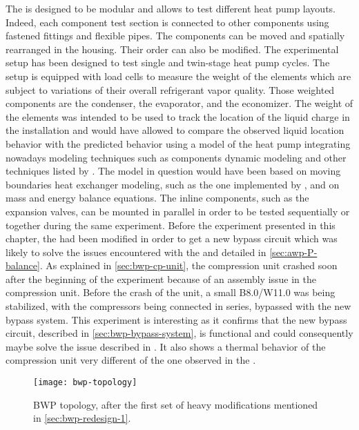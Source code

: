 The \BWP{} is designed to be modular and allows to test different heat
pump layouts. Indeed, each component test section is connected to
other components using fastened fittings and flexible pipes. The
components can be moved and spatially rearranged in the housing. Their
order can also be modified. The experimental setup has been designed to
test single and twin-stage heat pump cycles. The setup is equipped
with load cells to measure the weight of the elements which are
subject to variations of their overall refrigerant vapor
quality. Those weighted components are the condenser, the evaporator,
and the economizer. The weight of the elements was intended to be used
to track the location of the liquid charge in the installation and
would have allowed to compare the observed liquid location behavior
with the predicted behavior using a model of the heat pump integrating
nowadays modeling techniques such as components dynamic modeling and
other techniques listed by \citet{Ding-2007a}. The model in
question would have been based on moving boundaries heat exchanger
modeling, such as the one implemented by \citet{Bell-Lemort-2015a},
and on mass and energy balance equations. The inline components, such
as the expansion valves, can be mounted in parallel in order to be
tested sequentially or together during the same experiment. Before the
experiment presented in this chapter, the \BWP{} had been modified in
order to get a new bypass circuit which was likely to solve the issues
encountered with the \AWP{} and detailed in
\cref{sec:awp-P-balance}. As explained in \cref{sec:bwp-cp-unit}, the
compression unit crashed soon after the beginning of the experiment
because of an assembly issue in the compression unit. Before the crash
of the unit, a small B8.0/W11.0 \OP{} was being stabilized, with the
compressors being connected in series, bypassed with the new bypass
system. This experiment is interesting as it confirms that the new
bypass circuit, described in \cref{sec:bwp-bypass-system}, is
functional and could consequently maybe solve the issue described in
. It also shows a thermal behavior of the
compression unit very different of the one observed in the \AWP{}.

\begin{figure}
  \centering
  \texttt{[image: bwp-topology]}
  \caption{BWP topology, after the first set of heavy modifications
    mentioned in \cref{sec:bwp-redesign-1}.}
  \label{fig:bwp-topology}
\end{figure}

